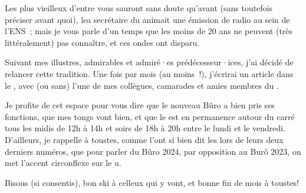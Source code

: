 
Les plus vieilleux d'entre vous sauront sans doute qu'avant (sans toutefois préciser avant quoi), le\ptm a secrétaire du
\cof{} animait une émission de radio au sein de l'ENS~; mais je vous parle d'un temps que les moins de 20 ans ne peuvent
(très littéralement) pas connaître, et ces ondes ont disparu. 

Suivant mes illustres, admirables et admiré·es prédécesseur·ices, j'ai décidé de relancer cette tradition. Une fois par mois
(au moins~!), j'écrirai un article dans le \BOcal{}, avec (ou sans) l'un\ptm e de mes collègues, camarades et ami\ptm es
membres du \cof. 

Je profite de cet espace pour vous dire que le nouveau Bûro a bien pris ses fonctions, que mes tongs vont bien, et que
le \cof{} est en permanence autour du carré tous les midis de 12h à 14h et soirs de 18h à 20h entre le lundi et le
vendredi. D'ailleurs, je rappelle à tous\ptm{}tes, comme l'ont si bien dit les \BOcaleuxses{} lors de leurs deux derniers
numéros, que pour parler du Bûro 2024, par opposition au Burô 2023, on met l'accent circonflexe sur le u.

Bisous (si consentis), bon ski à celleux qui y vont, et bonne fin de mois à tous\ptm tes! 

\signature{Matthieu,\\ secrétaire du nouveau \cof}

